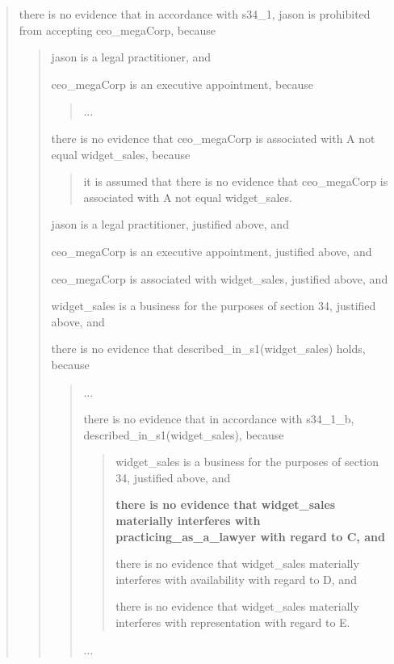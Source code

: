 \documentclass[sigconf]{acmart}
\begin{document}
\begin{quote}
there is no evidence that in accordance with s34\_1, jason is prohibited from accepting ceo\_megaCorp, because
\begin{quote}
    
    jason is a legal practitioner, and
    
    ceo\_megaCorp is an executive appointment, because
    \begin{quote}
        ...
    \end{quote}
    there is no evidence that ceo\_megaCorp is associated with A not equal widget\_sales, because
    \begin{quote}
        it is assumed that there is no evidence that ceo\_megaCorp is associated with A not equal widget\_sales.
    \end{quote}
    jason is a legal practitioner, justified above, and
    
    ceo\_megaCorp is an executive appointment, justified above, and
    
    ceo\_megaCorp is associated with widget\_sales, justified above, and
    
    widget\_sales is a business for the purposes of section 34, justified above, and
    
    there is no evidence that described\_in\_s1(widget\_sales) holds, because
    \begin{quote}
        
        ...
        
        there is no evidence that in accordance with s34\_1\_b, described\_in\_s1(widget\_sales), because
        \begin{quote}
            
            widget\_sales is a business for the purposes of section 34, justified above, and
            
            \textbf{there is no evidence that widget\_sales materially interferes with practicing\_as\_a\_lawyer with regard to C, and}
            
            there is no evidence that widget\_sales materially interferes with availability with regard to D, and
            
            there is no evidence that widget\_sales materially interferes with representation with regard to E.
        \end{quote}
        ...
    \end{quote}
\end{quote}
\end{quote}
\end{document}
